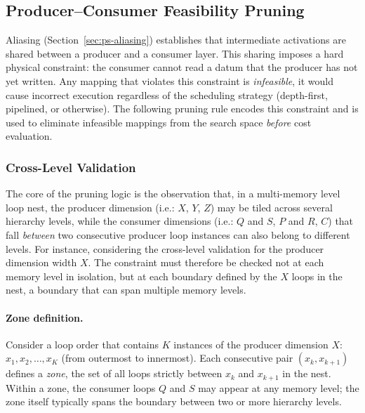 \subsection{Producer--Consumer Feasibility Pruning}
\label{sec:ps-pruning}

Aliasing (Section~\ref{sec:ps-aliasing}) establishes that intermediate
activations are shared between a producer and a consumer layer.
This sharing imposes a hard physical constraint: the consumer cannot
read a datum that the producer has not yet written.
Any mapping that violates this constraint is \emph{infeasible},  it
would cause incorrect execution regardless of the scheduling strategy
(depth-first, pipelined, or otherwise).
The following pruning rule encodes this constraint and is used to
eliminate infeasible mappings from the search space \emph{before} cost
evaluation.


\subsubsection{Cross-Level Validation}
\label{sec:ps-cross-level}

The core of the pruning logic is the observation that, in a
multi-memory level loop nest, the producer dimension (i.e.: $X$, $Y$, $Z$) may be tiled
across several hierarchy levels, while the consumer dimensions (i.e.: $Q$ and $S$, $P$ and $R$, $C$) that fall \emph{between} two consecutive producer loop instances
can also belong to different levels.
For instance, considering the cross-level validation for the producer dimension width $X$.
The constraint must therefore be checked not at each memory level in
isolation, but at each boundary defined by the $X$ loops in the
nest, a boundary that can span multiple memory levels.

\paragraph{Zone definition.}
Consider a loop order that contains $K$ instances of the producer
dimension $X$: $x_1, x_2, \dots, x_K$ (from outermost to innermost).
Each consecutive pair $(x_k, x_{k+1})$ defines a \emph{zone}, the
set of all loops strictly between $x_k$ and $x_{k+1}$ in the nest.
Within a zone, the consumer loops $Q$ and $S$ may appear at any
memory level; the zone itself typically spans the boundary between
two or more hierarchy levels.


